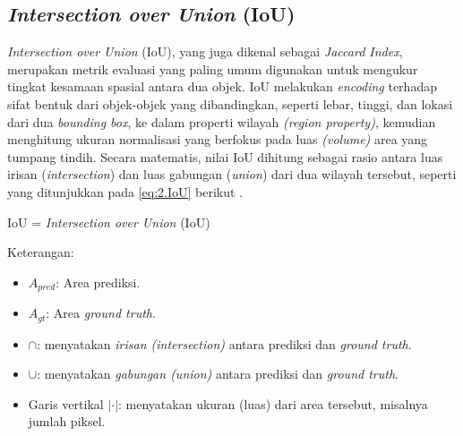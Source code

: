 \subsection{\textit{Intersection over Union} (IoU)} \label{II.TeoriIoU}
\textit{Intersection over Union} (IoU), yang juga dikenal sebagai \textit{Jaccard Index}, merupakan metrik evaluasi yang paling umum digunakan untuk mengukur tingkat kesamaan spasial antara dua objek. IoU melakukan \textit{encoding} terhadap sifat bentuk dari objek-objek yang dibandingkan, seperti lebar, tinggi, dan lokasi dari dua \textit{bounding box}, ke dalam properti wilayah \textit{(region property)}, kemudian menghitung ukuran normalisasi yang berfokus pada luas \textit{(volume)} area yang tumpang tindih. Secara matematis, nilai IoU dihitung sebagai rasio antara luas irisan (\textit{intersection}) dan luas gabungan (\textit{union}) dari dua wilayah tersebut, seperti yang ditunjukkan pada \ref{eq:2.IoU} berikut \cite{IoU}. \par

\vspace{0.5\baselineskip}
\begin{equationcaptioned}[eq:2.IoU]{
		IoU = 
	}{
		\textit{Intersection over Union} (IoU)
	}
\end{equationcaptioned}

Keterangan: 
\begin{itemize}
\renewcommand\labelitemi{} %
    \item \({A_{pred}}\): Area prediksi.
    \item \({A_{gt}}\): Area \textit{ground truth}.
    \item \(\cap\): menyatakan \textit{irisan (intersection)} antara prediksi dan \textit{ground truth}.
    \item \(\cup\): menyatakan \textit{gabungan (union)} antara prediksi dan \textit{ground truth}.
    \item Garis vertikal \(|\cdot|\): menyatakan ukuran (luas) dari area tersebut, misalnya jumlah piksel.
\end{itemize}





